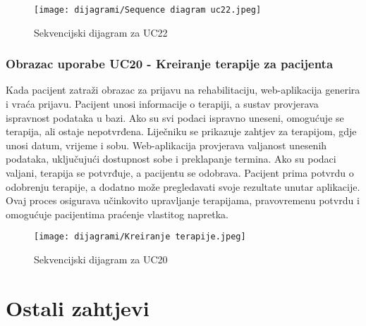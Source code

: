                     \begin{figure}[H]
			         \texttt{[image: dijagrami/Sequence diagram uc22.jpeg]}
			         \centering
			         \caption{Sekvencijski dijagram za UC22}
			         \label{fig:SequenceDiagram2}
		          \end{figure}
                
				\eject
				
				\subsubsection{Obrazac uporabe UC20 - Kreiranje terapije za pacijenta}
				
				
				Kada pacijent zatraži obrazac za prijavu na rehabilitaciju, web-aplikacija generira i vraća prijavu. Pacijent unosi informacije o terapiji, a sustav provjerava ispravnost podataka u bazi. Ako su svi podaci ispravno uneseni, omogućuje se terapija, ali ostaje nepotvrđena. Liječniku se prikazuje zahtjev za terapijom, gdje unosi datum, vrijeme i sobu. Web-aplikacija provjerava valjanost unesenih podataka, uključujući dostupnost sobe i preklapanje termina. Ako su podaci valjani, terapija se potvrđuje, a pacijentu se odobrava. Pacijent prima potvrdu o odobrenju terapije, a dodatno može pregledavati svoje rezultate unutar aplikacije. Ovaj proces osigurava učinkovito upravljanje terapijama, pravovremenu potvrdu i omogućuje pacijentima praćenje vlastitog napretka.
				
				\begin{figure}[H]
					\texttt{[image: dijagrami/Kreiranje terapije.jpeg]}
					\centering
					\caption{Sekvencijski dijagram za UC20}
					\label{fig:SequenceDiagram3}
				\end{figure}
				
				\eject
	
		\section{Ostali zahtjevi}
		 
